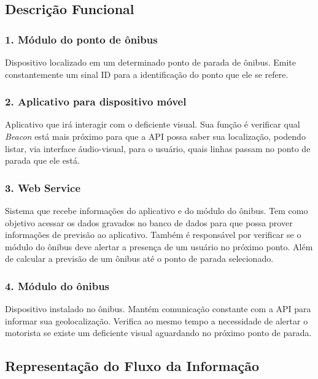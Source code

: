 \documentclass[
	12pt,				%
	oneside,			%
	a4paper,			%
	brazil				%
]{abntex2}
\begin{document}
{\subsection{Descrição Funcional}

\subsubsection*{1. Módulo do ponto de ônibus}

Dispositivo localizado em um determinado ponto de parada de ônibus. Emite constantemente um sinal ID para a identificação do ponto que ele se refere.

\subsubsection*{2. Aplicativo para dispositivo móvel}

Aplicativo que irá interagir com o deficiente visual. Sua função é verificar qual \textit{Beacon} está mais próximo para que a API possa saber sua localização, podendo listar, via interface áudio-visual, para o usuário, quais linhas passam no ponto de parada que ele está.

\subsubsection*{3. Web Service}

Sistema que recebe informações do aplicativo e do módulo do ônibus. Tem como objetivo acessar os dados gravados no banco de dados para que possa prover informações de previsão ao aplicativo. Também é responsável por verificar se o módulo do ônibus deve alertar a presença de um usuário no próximo ponto. Além de calcular a previsão de um ônibus até o ponto de parada selecionado.

\subsubsection*{4. Módulo do ônibus}

Dispositivo instalado no ônibus. Mantém comunicação constante com a API para informar sua geolocalização. Verifica ao mesmo tempo a necessidade de alertar o motorista se existe um deficiente visual aguardando no próximo ponto de parada.

\newpage

\subsection{Representação do Fluxo da Informação}

}
\end{document}
